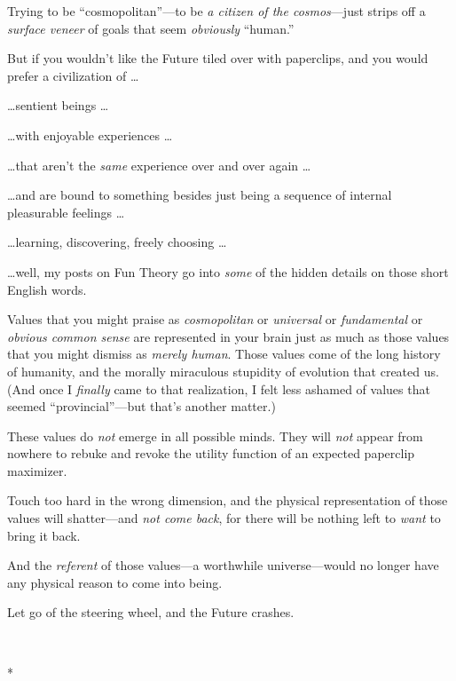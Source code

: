 {
 Trying to be
``cosmopolitan''---to be \textit{a
citizen of the cosmos}{}---just strips off a \textit{surface veneer} of
goals that seem \textit{obviously}
``human.''}

{
 But if you wouldn't like the Future tiled over
with paperclips, and you would prefer a civilization of \ldots}

{
 \ldots sentient beings \ldots}

{
 \ldots with enjoyable experiences \ldots}

{
 \ldots that aren't the \textit{same} experience
over and over again \ldots}

{
 \ldots and are bound to something besides just being a sequence of
internal pleasurable feelings \ldots}

{
 \ldots learning, discovering, freely choosing \ldots}

{
 \ldots well, my posts on Fun Theory go into \textit{some} of the
hidden details on those short English words.}

{
 Values that you might praise as \textit{cosmopolitan} or
\textit{universal} or \textit{fundamental} or \textit{obvious common
sense} are represented in your brain just as much as those values that
you might dismiss as \textit{merely human}. Those values come of the
long history of humanity, and the morally miraculous stupidity of
evolution that created us. (And once I \textit{finally} came to that
realization, I felt less ashamed of values that seemed
``provincial''---but
that's another matter.)}

{
 These values do \textit{not} emerge in all possible minds. They
will \textit{not} appear from nowhere to rebuke and revoke the utility
function of an expected paperclip maximizer.}

{
 Touch too hard in the wrong dimension, and the physical
representation of those values will shatter---and \textit{not come
back}, for there will be nothing left to \textit{want} to bring it
back.}

{
 And the \textit{referent} of those values---a worthwhile
universe---would no longer have any physical reason to come into
being.}

{
 Let go of the steering wheel, and the Future crashes.}

{\centering
 \ ~
\par}

{\centering
 *
\par}


